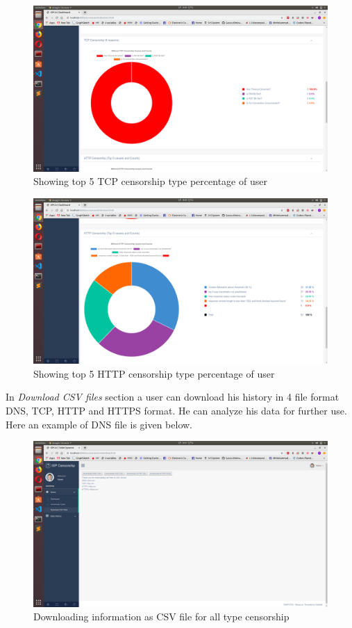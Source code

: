 \begin{figure}[h]
    \centering
    \includegraphics[width=\textwidth]{website/6tcp.png}
    \caption{Showing top 5 TCP censorship type percentage of user}
    \label{fig:web8}
\end{figure}



\begin{figure}[h]
    \centering
    \includegraphics[width=\textwidth]{website/7http.png}
    \caption{Showing top 5 HTTP censorship type percentage of user}
    \label{fig:web9}
\end{figure}

In \emph{Download CSV files} section a user can download his history in 4 file format DNS, TCP, HTTP and HTTPS format. He can analyze his data for further use. Here an example of DNS file is given below.

\begin{figure}[h]
    \centering
    \includegraphics[width=\textwidth]{website/8download.png}
    \caption{Downloading information as CSV file for all type censorship}
    \label{fig:web10}
\end{figure}

